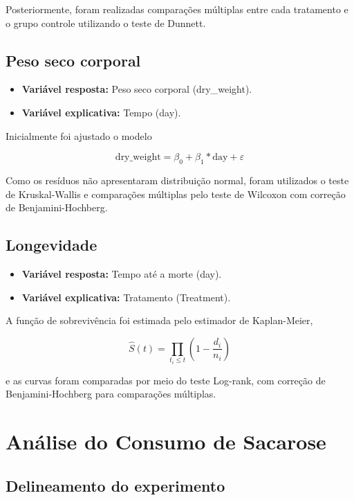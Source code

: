 \documentclass[
  brazilian,
  12pt,
  a4paper,
]{article}
\providecommand{\tightlist}{%
  \setlength{\itemsep}{0pt}\setlength{\parskip}{0pt}}
\begin{document}
Posteriormente, foram realizadas comparações múltiplas entre cada
tratamento e o grupo controle utilizando o teste de Dunnett.

\subsection{Peso seco corporal}\label{peso-seco-corporal}

\begin{itemize}
\item
  \textbf{Variável resposta:} Peso seco corporal (dry\_weight).
\item
  \textbf{Variável explicativa:} Tempo (day).
\end{itemize}

Inicialmente foi ajustado o modelo

\[
\text{dry\_weight}=\beta_0 + \beta_1*\text{day} + \varepsilon
\]

Como os resíduos não apresentaram distribuição normal, foram utilizados
o teste de Kruskal-Wallis e comparações múltiplas pelo teste de Wilcoxon
com correção de Benjamini-Hochberg.

\subsection{Longevidade}\label{longevidade}

\begin{itemize}
\tightlist
\item
  \textbf{Variável resposta:} Tempo até a morte (day).
\item
  \textbf{Variável explicativa:} Tratamento (Treatment).
\end{itemize}

A função de sobrevivência foi estimada pelo estimador de Kaplan-Meier,

\[
\hat{S}(t)=\prod_{t_i\le t}\left(1-\frac{d_i}{n_i}\right)
\]

e as curvas foram comparadas por meio do teste Log-rank, com correção de
Benjamini-Hochberg para comparações múltiplas.

\section{Análise do Consumo de
Sacarose}\label{anuxe1lise-do-consumo-de-sacarose}

\subsection{Delineamento do experimento}
\end{document}
